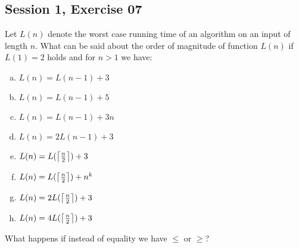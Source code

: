 \subsection{Session 1, Exercise 07}


Let $L(n)$ denote the worst case running time of an algorithm on an input of length $n$. What can be said about the order of magnitude of function $L(n)$ if $L(1) = 2$ holds and for $n>1$ we have:

\begin{enumerate}[a.)]
    \item $L(n) = L(n-1) + 3$
    \item $L(n) = L(n-1) + 5$
    \item $L(n) = L(n-1) + 3n$
    \item $L(n) = 2L(n-1) + 3$
    \item $L(n) = L(\ceil*{\frac{n}{2}}) + 3$
    \item $L(n) = L(\ceil*{\frac{n}{2}}) + n^k$
    \item $L(n) = 2L(\ceil*{\frac{n}{2}}) + 3$
    \item $L(n) = 4L(\ceil*{\frac{n}{2}}) + 3$
\end{enumerate}

What happens if instead of equality we have $\leq{}$ or $\geq{}$?

